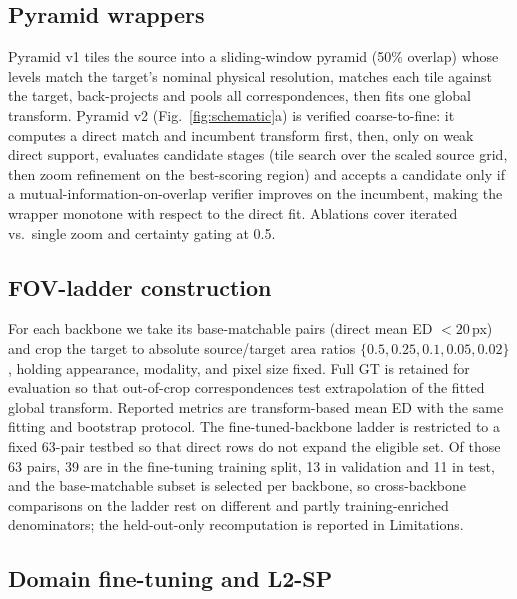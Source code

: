 \documentclass[fleqn,10pt]{wlscirep}
\begin{document}
\subsection*{Pyramid wrappers}

Pyramid v1 tiles the source into a sliding-window pyramid (50\% overlap) whose levels match the target's nominal physical resolution, matches each tile against the target, back-projects and pools all correspondences, then fits one global transform. Pyramid v2 (Fig.~\ref{fig:schematic}a) is verified coarse-to-fine: it computes a direct match and incumbent transform first, then, only on weak direct support, evaluates candidate stages (tile search over the scaled source grid, then zoom refinement on the best-scoring region) and accepts a candidate only if a mutual-information-on-overlap verifier improves on the incumbent, making the wrapper monotone with respect to the direct fit. Ablations cover iterated vs.\ single zoom and certainty gating at 0.5.

\subsection*{FOV-ladder construction}

For each backbone we take its base-matchable pairs (direct mean ED $<20$\,px) and crop the target to absolute source/target area ratios $\{0.5,0.25,0.1,0.05,0.02\}$, holding appearance, modality, and pixel size fixed. Full GT is retained for evaluation so that out-of-crop correspondences test extrapolation of the fitted global transform. Reported metrics are transform-based mean ED with the same fitting and bootstrap protocol. The fine-tuned-backbone ladder is restricted to a fixed 63-pair testbed so that direct rows do not expand the eligible set. Of those 63 pairs, 39 are in the fine-tuning training split, 13 in validation and 11 in test, and the base-matchable subset is selected per backbone, so cross-backbone comparisons on the ladder rest on different and partly training-enriched denominators; the held-out-only recomputation is reported in Limitations.

\subsection*{Domain fine-tuning and L2-SP}
\end{document}

